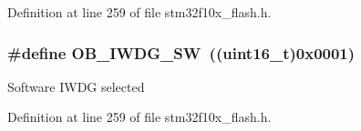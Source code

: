 Definition at line 259 of file stm32f10x\+\_\+flash.\+h.

\subsubsection[{\texorpdfstring{O\+B\+\_\+\+I\+W\+D\+G\+\_\+\+SW}{OB_IWDG_SW}}]{\setlength{\rightskip}{0pt plus 5cm}\#define O\+B\+\_\+\+I\+W\+D\+G\+\_\+\+SW~(({\bf uint16\+\_\+t})0x0001)}\hypertarget{group___option___bytes___i_watchdog_ga5a357e232c955444c3f2ccb9a937ffce}{}\label{group___option___bytes___i_watchdog_ga5a357e232c955444c3f2ccb9a937ffce}
Software I\+W\+DG selected 

Definition at line 259 of file stm32f10x\+\_\+flash.\+h.

